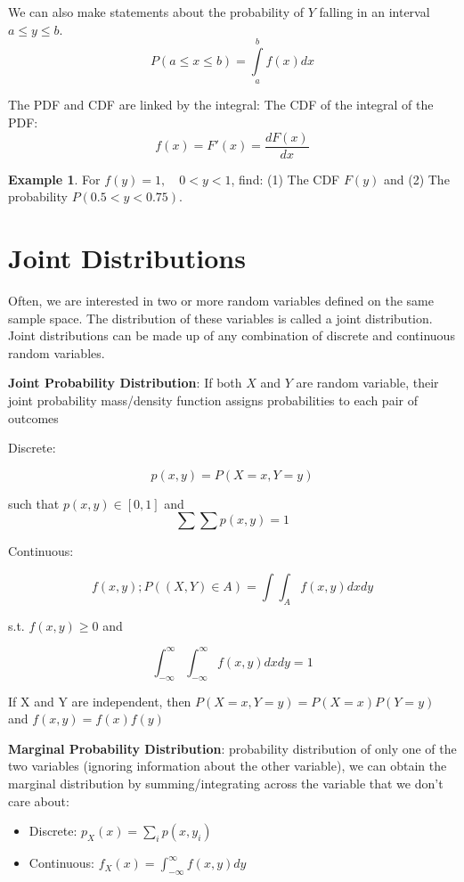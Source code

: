 \documentclass[
]{book}
\providecommand{\tightlist}{%
  \setlength{\itemsep}{0pt}\setlength{\parskip}{0pt}}
\theoremstyle{definition}
\theoremstyle{definition}
\newtheorem{example}{Example}[chapter]
\theoremstyle{definition}
\theoremstyle{definition}
\theoremstyle{remark}
\begin{document}
We can also make statements about the probability of \(Y\) falling in an interval \(a\le y\le b\).
\[P(a\le x\le b)=\int\limits_a^b f(x)dx\]

The PDF and CDF are linked by the integral: The CDF of the integral of the PDF: \[f(x) = F'(x)=\frac{dF(x)}{dx}\]

\begin{example}
\protect\hypertarget{exm:unnamed-chunk-268}{}{\label{exm:unnamed-chunk-268} }
For \(f(y)=1, \quad 0<y<1\), find: (1) The CDF \(F(y)\) and (2) The probability \(P(0.5<y<0.75)\).
\end{example}

\hypertarget{joint-distributions}{%
\section{Joint Distributions}\label{joint-distributions}}

Often, we are interested in two or more random variables defined on the same sample space. The distribution of these variables is called a joint distribution. Joint distributions can be made up of any combination of discrete and continuous random variables.

\textbf{Joint Probability Distribution}: If both \(X\) and \(Y\) are random variable, their joint probability mass/density function assigns probabilities to each pair of outcomes

Discrete:

\[p(x, y) = P(X = x, Y = y)\]

such that \(p(x,y) \in [0,1]\) and \[\sum\sum p(x,y) = 1\]

Continuous:

\[f(x,y);P((X,Y) \in A) = \int\!\!\!\int_A f(x,y)dx dy \]

s.t. \(f(x,y)\ge 0\) and

\[\int_{-\infty}^\infty\int_{-\infty}^\infty f(x,y)dxdy = 1\]

If X and Y are independent, then \(P(X=x,Y=y) = P(X=x)P(Y=y)\) and \(f(x,y) = f(x)f(y)\)

\textbf{Marginal Probability Distribution}: probability distribution of only one of the two variables (ignoring information about the other variable), we can obtain the marginal distribution by summing/integrating across the variable that we don't care about:

\begin{itemize}
\tightlist
\item
  Discrete: \(p_X(x) = \sum_i p(x, y_i)\)
\item
  Continuous: \(f_X(x) = \int_{-\infty}^\infty f(x,y)dy\)
\end{itemize}
\end{document}

